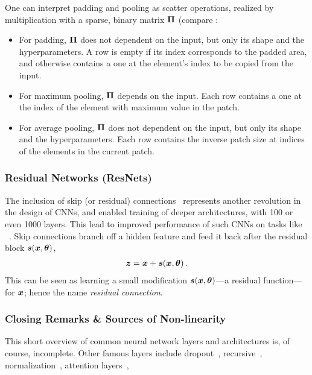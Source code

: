 One can interpret padding and pooling as scatter operations, realized by
multiplication with a sparse, binary matrix ${\bm{\Pi}}$ (compare
:
\begin{itemize}
\item For padding, ${\bm{\Pi}}$ does not dependent on the input, but only its shape
  and the hyperparameters. A row is empty if its index corresponds to the padded
  area, and otherwise contains a one at the element's index to be copied from
  the input.

\item For maximum pooling, ${\bm{\Pi}}$ depends on the input. Each row contains a one
  at the index of the element with maximum value in the patch.

\item For average pooling, ${\bm{\Pi}}$ does not dependent on the input, but only its
  shape and the hyperparameters. Each row contains the inverse patch size at
  indices of the elements in the current patch.
\end{itemize}

\subsubsection{Residual Networks (ResNets)}

The inclusion of skip (or residual) connections~\cite{he2016deep} represents
another revolution in the design of CNNs, and enabled training of deeper
architectures, with 100 or even 1000 layers. This lead to improved performance
of such CNNs on tasks like
\imagenet~\cite{deng2009imagenet,russakovsky2015imagenet}. Skip connections
branch off a hidden feature and feed it back after the residual block ${\bm{s}}({\bm{x}},
{\bm{\theta}})$,
\begin{align*}
  {\bm{z}} = {\bm{x}} + {\bm{s}}({\bm{x}}, {\bm{\theta}})\,.
\end{align*}
This can be seen as learning a small modification ${\bm{s}}({\bm{x}}, {\bm{\theta}})$---a
residual function---for ${\bm{x}}$; hence the name \emph{residual connection}.

\subsubsection{Closing Remarks \& Sources of Non-linearity}

This short overview of common neural network layers and architectures is, of
course, incomplete. Other famous layers include
dropout~\cite{srivastava2014dropout},
recursive~\cite{hochreither1997lstm,cho2014properties,elman1990finding},
normalization~\cite{ioffe2015batch,wu2019group}, attention
layers~\cite{vaswani2017attention}, \etc

